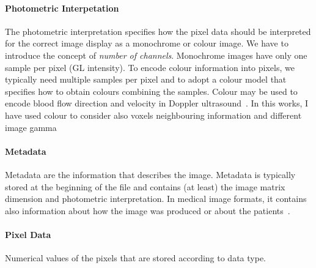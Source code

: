 \documentclass{standalone}
\begin{document}
	\paragraph{Photometric Interpetation} The photometric interpretation specifies how the pixel data should be interpreted for the correct image display as a monochrome or colour image. We have to introduce the concept of \emph{number of channels}. Monochrome images have only one sample per pixel (GL intensity). To encode colour information into pixels, we typically need multiple samples per pixel and to adopt a colour model that specifies how to obtain colours combining the samples. Colour may be used to encode blood flow direction and velocity in Doppler ultrasound~\cite{ART:Larobina}. In this works, I have used colour to consider also voxels neighbouring information and different image gamma 
	
	\paragraph{Metadata} 
	Metadata are the information that describes the image. Metadata is typically stored at the beginning of the file and contains (at least) the image matrix dimension and photometric interpretation. In medical image formats, it contains also information about how the image was produced or about the patients~\cite{ART:Larobina}.
	
	\paragraph{Pixel Data} Numerical values of the pixels that are stored according to data type. 
			
\end{document}
